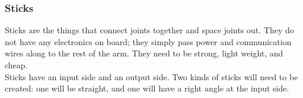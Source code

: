\subsubsection{Sticks}

Sticks are the things that connect joints together and space joints out. They do not have any electronics on board; they simply pass power and communication wires along to the rest of the arm. They need to be strong, light weight, and cheap.\\
\newline
Sticks have an input side and an output side. Two kinds of sticks will need to be created: one will be straight, and one will have a right angle at the input side.

\pagebreak



\FPeval{\runCount}{\startNum}

